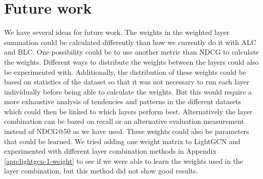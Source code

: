 \section{Future work}
We have several ideas for future work.
The weights in the weighted layer summation could be calculated differently than how we currently do it with ALC and BLC.
One possibility could be to use another metric than NDCG to calculate the weights.
Different ways to distribute the weights between the layers could also be experimented with.
Additionally, the distribution of these weights could be based on statistics of the dataset so that it was not necessary to run each layer individually before being able to calculate the weights.
But this would require a more exhaustive analysis of tendencies and patterns in the different datasets which could then be linked to which layers perform best.
Alternatively the layer combination can be based on recall or an alternative evaluation measurement instead of NDCG@50 as we have used.
These weights could also be parameters that could be learned.
We tried adding one weight matrix to LightGCN and experimented with different layer combination methods in Appendix \ref{app:lightgcn-1-weight} to see if we were able to learn the weights used in the layer combination, but this method did not show good results.



